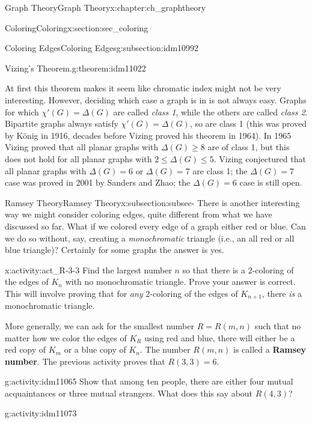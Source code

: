 \documentclass[oneside,10pt,]{book}
\newcommand{\terminology}[1]{\textbf{#1}}
\numberwithin{equation}{chapter}
\begin{document}
\begin{chapterptx}{Graph Theory}{}{Graph Theory}{}{}{x:chapter:ch_graphtheory}
\begin{sectionptx}{Coloring}{}{Coloring}{}{}{x:section:sec_coloring}
\begin{subsectionptx}{Coloring Edges}{}{Coloring Edges}{}{}{g:subsection:idm10992}
\begin{theorem}{Vizing's Theorem.}{}{g:theorem:idm11022}
\end{theorem}
At first this theorem makes it seem like chromatic index might not be very interesting. However, deciding which case a graph is in is not always easy. Graphs for which \(\chi'(G) = \Delta(G)\) are called \emph{class 1}, while the others are called \emph{class 2}. Bipartite graphs always satisfy \(\chi'(G) = \Delta(G)\), so are class 1 (this was proved by König in 1916, decades before Vizing proved his theorem in 1964). In 1965 Vizing proved that all planar graphs with \(\Delta(G) \ge 8\) are of class 1, but this does not hold for all planar graphs with \(2 \le \Delta(G) \le 5\). Vizing conjectured that all planar graphs with \(\Delta(G) = 6\) or \(\Delta(G) = 7\) are class 1; the \(\Delta(G) = 7\) case was proved in 2001 by Sanders and Zhao; the \(\Delta(G) = 6\) case is still open.%
\end{subsectionptx}
%
%
\typeout{************************************************}
\typeout{************************************************}
%
\begin{subsectionptx}{Ramsey Theory}{}{Ramsey Theory}{}{}{x:subsection:subsec-}
There is another interesting way we might consider coloring edges, quite different from what we have discussed so far. What if we colored every edge of a graph either red or blue. Can we do so without, say, creating a \emph{monochromatic} triangle (i.e., an all red or all blue triangle)? Certainly for some graphs the answer is yes.%
\begin{activity}{}{x:activity:act_R-3-3}%
Find the largest number \(n\) so that there is a 2-coloring of the edges of \(K_n\) with no monochromatic triangle.  Prove your answer is correct.  This will involve proving that for \emph{any} 2-coloring of the edges of \(K_{n+1}\), there \emph{is} a monochromatic triangle.%
\end{activity}
More generally, we can ask for the smallest number \(R = R(m,n)\) such that no matter how we color the edges of \(K_R\) using red and blue, there will either be a red copy of \(K_m\) or a blue copy of \(K_n\).  The number \(R(m,n)\) is called a \terminology{Ramsey number}.  The previous activity proves that \(R(3,3) = 6\).%
\begin{activity}{}{g:activity:idm11065}%
Show that among ten people, there are either four mutual acquaintances or three mutual strangers.  What does this say about \(R(4,3)\)?%
\end{activity}
\begin{activity}{}{g:activity:idm11073}%

\end{activity}
\end{subsectionptx}
\end{sectionptx}
\end{chapterptx}
\end{document}
